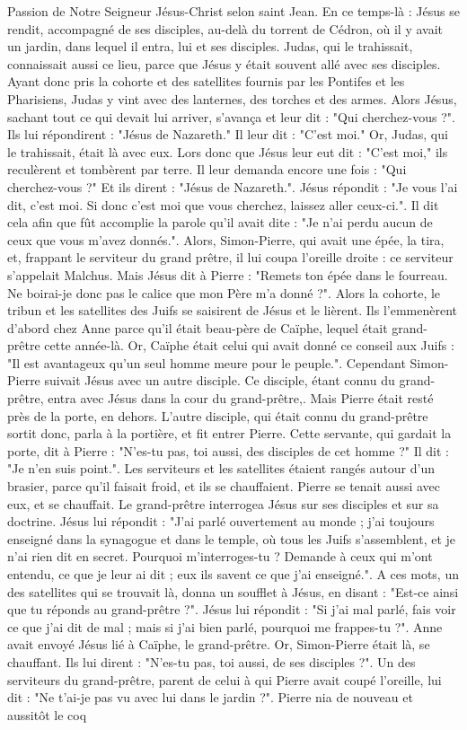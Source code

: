 Passion de Notre Seigneur Jésus-Christ selon saint Jean.
En ce temps-là : Jésus se rendit, accompagné de ses disciples, au-delà du torrent de Cédron, où il y avait un jardin, dans lequel il entra, lui et ses disciples. Judas, qui le trahissait, connaissait aussi ce lieu, parce que Jésus y était souvent allé avec ses disciples. Ayant donc pris la cohorte et des satellites fournis par les Pontifes et les Pharisiens, Judas y vint avec des lanternes, des torches et des armes. Alors Jésus, sachant tout ce qui devait lui arriver, s’avança et leur dit : "Qui cherchez-vous ?". Ils lui répondirent : "Jésus de Nazareth." Il leur dit : "C’est moi." Or, Judas, qui le trahissait, était là avec eux. Lors donc que Jésus leur eut dit : "C’est moi," ils reculèrent et tombèrent par terre. Il leur demanda encore une fois : "Qui cherchez-vous ?" Et ils dirent : "Jésus de Nazareth.". Jésus répondit : "Je vous l’ai dit, c’est moi. Si donc c’est moi que vous cherchez, laissez aller ceux-ci.". Il dit cela afin que fût accomplie la parole qu’il avait dite : "Je n’ai perdu aucun de ceux que vous m’avez donnés.". Alors, Simon-Pierre, qui avait une épée, la tira, et, frappant le serviteur du grand prêtre, il lui coupa l’oreille droite : ce serviteur s’appelait Malchus. Mais Jésus dit à Pierre : "Remets ton épée dans le fourreau. Ne boirai-je donc pas le calice que mon Père m’a donné ?". Alors la cohorte, le tribun et les satellites des Juifs se saisirent de Jésus et le lièrent. Ils l’emmenèrent d’abord chez Anne parce qu’il était beau-père de Caïphe, lequel était grand-prêtre cette année-là. Or, Caïphe était celui qui avait donné ce conseil aux Juifs : "Il est avantageux qu’un seul homme meure pour le peuple.". Cependant Simon-Pierre suivait Jésus avec un autre disciple. Ce disciple, étant connu du grand-prêtre, entra avec Jésus dans la cour du grand-prêtre,. Mais Pierre était resté près de la porte, en dehors. L’autre disciple, qui était connu du grand-prêtre sortit donc, parla à la portière, et fit entrer Pierre. Cette servante, qui gardait la porte, dit à Pierre : "N’es-tu pas, toi aussi, des disciples de cet homme ?" Il dit : "Je n’en suis point.". Les serviteurs et les satellites étaient rangés autour d’un brasier, parce qu’il faisait froid, et ils se chauffaient. Pierre se tenait aussi avec eux, et se chauffait. Le grand-prêtre interrogea Jésus sur ses disciples et sur sa doctrine. Jésus lui répondit : "J’ai parlé ouvertement au monde ; j’ai toujours enseigné dans la synagogue et dans le temple, où tous les Juifs s’assemblent, et je n’ai rien dit en secret. Pourquoi m’interroges-tu ? Demande à ceux qui m’ont entendu, ce que je leur ai dit ; eux ils savent ce que j’ai enseigné.". A ces mots, un des satellites qui se trouvait là, donna un soufflet à Jésus, en disant : "Est-ce ainsi que tu réponds au grand-prêtre ?". Jésus lui répondit : "Si j’ai mal parlé, fais voir ce que j’ai dit de mal ; mais si j’ai bien parlé, pourquoi me frappes-tu ?". Anne avait envoyé Jésus lié à Caïphe, le grand-prêtre. Or, Simon-Pierre était là, se chauffant. Ils lui dirent : "N’es-tu pas, toi aussi, de ses disciples ?". Un des serviteurs du grand-prêtre, parent de celui à qui Pierre avait coupé l’oreille, lui dit : "Ne t’ai-je pas vu avec lui dans le jardin ?". Pierre nia de nouveau et aussitôt le coq 